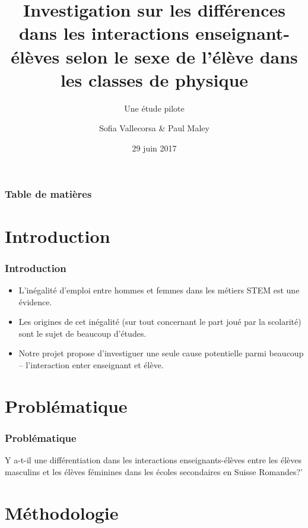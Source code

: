 \documentclass{beamer}
\title{Investigation sur les différences dans les interactions
  enseignant-élèves selon le sexe de l’élève dans les classes
  de physique}
\subtitle{Une étude pilote }
\author{Sofia Vallecorsa \& Paul Maley}
\date{29 juin 2017}
\begin{document}
\frame{\titlepage}

\begin{frame}
\frametitle{Table de matières}
\tableofcontents
\end{frame}

\section{Introduction}
\begin{frame}
\frametitle{Introduction}
\begin{itemize}
\item L'inégalité d'emploi entre hommes et femmes dans les métiers STEM est une évidence.
\item Les origines de cet inégalité (sur tout concernant le part joué par la scolarité) sont le sujet de beaucoup d'études.
\item Notre projet propose d'investiguer une seule cause potentielle parmi beaucoup -- l'interaction enter enseignant et élève.
\end{itemize}
\end{frame}

\section{Problématique}
\begin{frame}
\frametitle{Problématique}
\begin{block}{ }
Y a-t-il une différentiation dans les interactions enseignants-élèves entre les élèves masculins et les élèves féminines dans les écoles secondaires en Suisse Romandes?'
\end{block}
\end{frame}

\section{Méthodologie}
\end{document}
